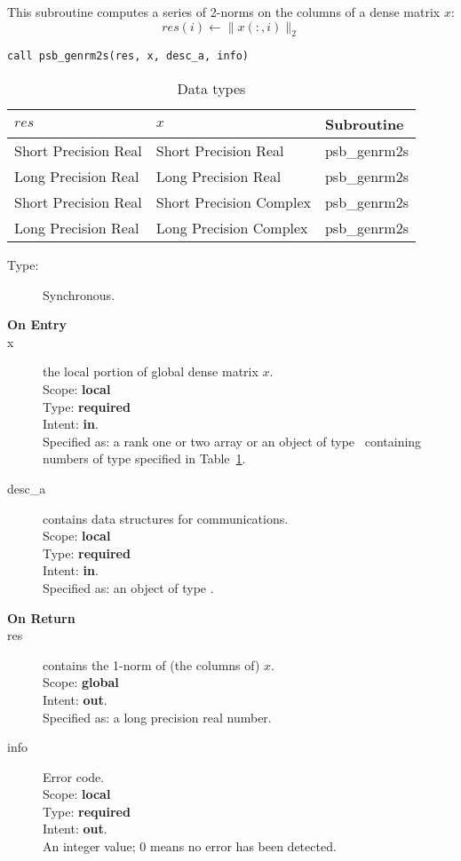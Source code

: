 This subroutine computes a series of  2-norms on the columns of
a  dense matrix  $x$: 
\[ res(i) \leftarrow \|x(:,i)\|_2 \]


\begin{verbatim}
call psb_genrm2s(res, x, desc_a, info)
\end{verbatim}

\begin{table}[h]
\begin{center}
\begin{tabular}{lll}
\hline
$res$ & $x$ & {\bf Subroutine}\\
\hline
Short Precision Real&Short Precision Real & psb\_genrm2s \\
Long Precision Real&Long Precision Real & psb\_genrm2s \\
Short Precision Real&Short Precision Complex & psb\_genrm2s \\
Long Precision Real&Long Precision Complex & psb\_genrm2s \\
\hline
\end{tabular}
\end{center}
\caption{Data types\label{tab:f90nrm2s}}
\end{table}

\begin{description}
\item[Type:] Synchronous.
\item[\bf On Entry]
\item[x] the local portion of global dense matrix
$x$. %
\\
Scope: {\bf local} \\
Type: {\bf required} \\
Intent: {\bf in}.\\
Specified as: a rank one or two array or an object of type \vdata\ 
containing numbers of type specified in
Table~\ref{tab:f90nrm2s}.
\item[desc\_a] contains data structures for communications.\\
Scope: {\bf local} \\
Type: {\bf required}\\
Intent: {\bf in}.\\
Specified as: an object of type \descdata.

\item[\bf On Return] 
\item[res] contains the 1-norm of (the columns of) $x$.\\
Scope: {\bf global} \\
Intent: {\bf out}.\\
Specified as: a long precision real  number.
\item[info] Error code.\\
Scope: {\bf local} \\
Type: {\bf required} \\
Intent: {\bf out}.\\
An integer value; 0 means no error has been detected. 
\end{description}




